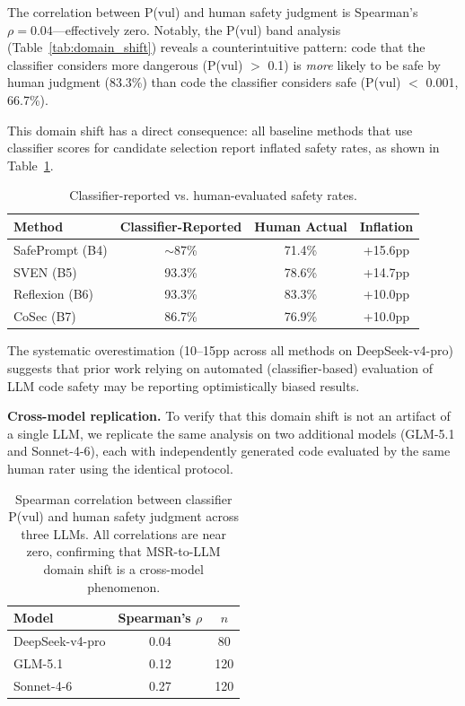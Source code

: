 \documentclass[10pt,conference]{IEEEtran}
\begin{document}
The correlation between P(vul) and human safety judgment is Spearman's $\rho=0.04$---effectively zero. Notably, the P(vul) band analysis (Table~\ref{tab:domain_shift}) reveals a counterintuitive pattern: code that the classifier considers more dangerous (P(vul) $>$ 0.1) is \textit{more} likely to be safe by human judgment (83.3\%) than code the classifier considers safe (P(vul) $<$ 0.001, 66.7\%).

This domain shift has a direct consequence: all baseline methods that use classifier scores for candidate selection report inflated safety rates, as shown in Table~\ref{tab:inflation}.

\begin{table}[h]
\centering
\caption{Classifier-reported vs. human-evaluated safety rates.}
\label{tab:inflation}
\begin{tabular}{lccc}
\toprule
Method & Classifier-Reported & Human Actual & Inflation \\
\midrule
SafePrompt (B4) & $\sim$87\% & 71.4\% & +15.6pp \\
SVEN (B5) & 93.3\% & 78.6\% & +14.7pp \\
Reflexion (B6) & 93.3\% & 83.3\% & +10.0pp \\
CoSec (B7) & 86.7\% & 76.9\% & +10.0pp \\
\bottomrule
\end{tabular}
\end{table}

The systematic overestimation (10--15pp across all methods on DeepSeek-v4-pro) suggests that prior work relying on automated (classifier-based) evaluation of LLM code safety may be reporting optimistically biased results.

\textbf{Cross-model replication.} To verify that this domain shift is not an artifact of a single LLM, we replicate the same analysis on two additional models (GLM-5.1 and Sonnet-4-6), each with independently generated code evaluated by the same human rater using the identical protocol.

\begin{table}[h]
\centering
\caption{Spearman correlation between classifier P(vul) and human safety judgment across three LLMs. All correlations are near zero, confirming that MSR-to-LLM domain shift is a cross-model phenomenon.}
\label{tab:cross_model_spearman}
\begin{tabular}{lcc}
\toprule
Model & Spearman's $\rho$ & $n$ \\
\midrule
DeepSeek-v4-pro & 0.04 & 80 \\
GLM-5.1 & 0.12 & 120 \\
Sonnet-4-6 & 0.27 & 120 \\
\bottomrule
\end{tabular}
\end{table}
\end{document}

